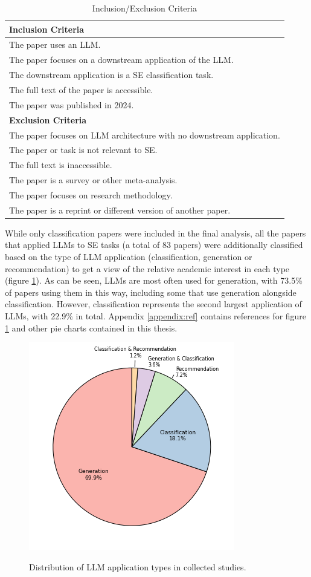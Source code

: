 \documentclass[a4paper]{article}
\begin{document}
\begin{table}[H]
    \caption{Inclusion/Exclusion Criteria}
    \begin{tabularx}{\textwidth}{|X|} \hline
        \textbf{Inclusion Criteria} \\ \hline
        The paper uses an LLM.  \\
        The paper focuses on a downstream application of the LLM. \\
        The downstream application is a SE classification task. \\
        The full text of the paper is accessible. \\
        The paper was published in 2024. \\ \hline
        \textbf{Exclusion Criteria} \\ \hline
        The paper focuses on LLM architecture with no downstream application. \\
        The paper or task is not relevant to SE. \\
        The full text is inaccessible. \\
        The paper is a survey or other meta-analysis. \\
        The paper focuses on research methodology. \\
        The paper is a reprint or different version of another paper. \\ \hline
    \end{tabularx}
    
    \label{table:criteria}
\end{table}

While only classification papers were included in the final analysis, all the papers that applied LLMs to SE tasks (a total of 83 papers) were additionally classified based on the type of LLM application (classification, generation or recommendation) to get a view of the relative academic interest in each type (figure \ref{fig:LLMTypes}). As can be seen, LLMs are most often used for generation, with 73.5\% of papers using them in this way, including some that use generation alongside classification. However, classification represents the second largest application of LLMs, with 22.9\% in total. Appendix \ref{appendix:ref} contains references for figure \ref{fig:LLMTypes} and other pie charts contained in this thesis.

\begin{figure}[h]
	\caption{Distribution of LLM application types in collected studies.}
	\includegraphics[width=0.5\linewidth]{figures/LLMTypes.png}
	\label{fig:LLMTypes}
\end{figure}
\end{document}
